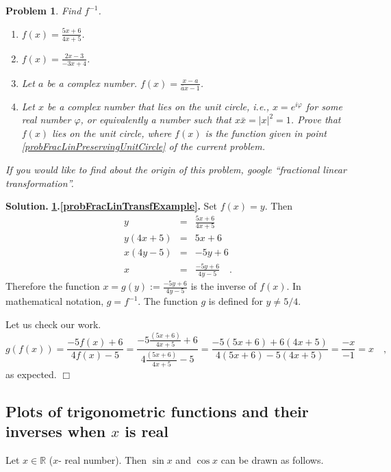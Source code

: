 \documentclass[12pt]{book}
\newenvironment{solution}{\textbf{Solution.} }{$\Box$}
\newtheorem{problem}{Problem}[section]
\begin{document}
\begin{problem}\label{probFracLin}
Find $f^{-1}$.
\begin{enumerate}
\item \label{probFracLinTransfExample}  $f(x)= \frac{5x+6}{4x+5}$.
\item  $f(x)= \frac{2x-3}{-3x+4}$.
\item \label{probFracLinPreservingUnitCircle} Let $a$ be a complex number. $\displaystyle f(x)=\frac{x-a}{\bar a x-1}$.
\item  Let $x$ be a complex number that lies on the unit circle, i.e., $x=e^{i\varphi}$ for some real number $\varphi$, or equivalently a number such that $ x \bar x = |x|^2 =1$. Prove that $f(x)$ lies on the unit circle, where $f(x)$ is the function given in point \ref{probFracLinPreservingUnitCircle} of the current problem.
\end{enumerate}
If you would like to find about the origin of this problem, google ``fractional linear transformation''. 
\end{problem}
\begin{solution}
\textbf{\ref{probFracLin}.\ref{probFracLinTransfExample}.} Set $f(x)=y$. Then 
\[
\begin{array}{rcl}
y&=&\displaystyle \frac{5x+6}{4x+5}\\
y(4x+5)&=&5x+6\\
x(4y-5)&=&-5y+6\\
x&=&\displaystyle \frac{-5y+6}{4y-5}\quad .
\end{array}
\]
Therefore the function $x=g(y):=\frac{-5y+6}{4y-5}$ is the inverse of $f(x)$. In mathematical notation, $g=f^{-1}$. The function $g$ is defined for $y\neq 5/4$.

Let us check our work.
\[
g(f(x))=  \frac{-5f(x) +6}{4f(x)-5}=  \frac{-5\frac{(5x+6)}{4x+5} +6}{4\frac{(5x+6)}{4x+5}-5}= \frac{-5(5x+6) +6(4x+5)}{4(5x+6)-5(4x+5)}=\frac{-x}{-1}=x\quad ,
\]
as expected.
\end{solution}
\subsection{Plots of trigonometric functions and their inverses when $x$ is real}\label{secGraphsTrigFunc}
Let $x\in \mathbb R$ ($x$- real number). Then $\sin x$ and $\cos x$ can be drawn as follows.
\end{document}
